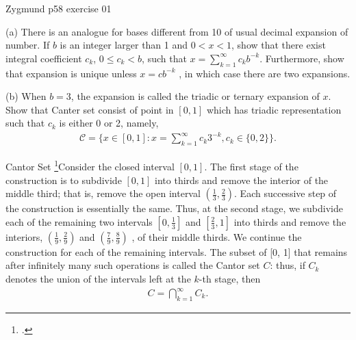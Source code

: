 \documentclass[UTF8,a4paper,10pt]{article}
\begin{document}

  \begin{Problem}[]{Zygmund p58 exercise 01}

    (a) There is an analogue for bases different from 10 of usual decimal expansion of number. If $b$ is an integer larger than 1 and $0 < x < 1$,
    show that there exist integral coefficient $c_k$, $0 \leq c_k < b$, such that $x = \sum_{k=1}^{\infty}c_k b^{-k}$. Furthermore, show that expansion is unique unless
    $x = cb^{-k}$
    , in which case there are two expansions.  


    (b) When $b = 3$, the expansion is called the triadic or ternary
    expansion of $x$. Show that Canter set consist of point in $[0,1]$ which has triadic representation such that $c_k$ is either 0 or 2, namely,
    \begin{equation*}
      \begin{aligned}
        \mathcal{C}  = \{x \in [0, 1] : x =\sum_{k=1}^{\infty}c_k 3^{-k}, c_k \in \{0, 2\}\}.
      \end{aligned}
    \end{equation*}
  \end{Problem}

  \begin{mybox}{Cantor Set}
    \footcite[][42-43]{Wheeden_Zygmund_2015}Consider the closed interval \([0, 1]\). The first stage of the construction is to
subdivide \([0, 1]\) into thirds and remove the interior of the middle third; that
is, remove the open interval \(\left(\frac{1}{3},\frac{2}{3}\right)\). Each successive step of the construction is essentially the same. Thus, at the second stage, we subdivide each of the
remaining two intervals \(\left[0,\frac{1}{3}\right]\)
and  \(\left[\frac{2}{3},1\right]\) into thirds and remove the interiors, \(\left(\frac{1}{9},\frac{2}{9}\right)\) and \(\left(\frac{7}{9},\frac{8}{9}\right)\)
, of their middle thirds. We continue the construction for each of the remaining intervals. The subset of [0, 1] that remains after infinitely many such operations is
called the Cantor set \(C\): thus, if \(C_k\) denotes the union of the intervals left at the
$k$-th stage, then
\begin{equation*}
  \begin{aligned}
    C =  \bigcap_{k=1}^{\infty} C_k  .
  \end{aligned}
\end{equation*}

  \end{mybox}
\end{document}
